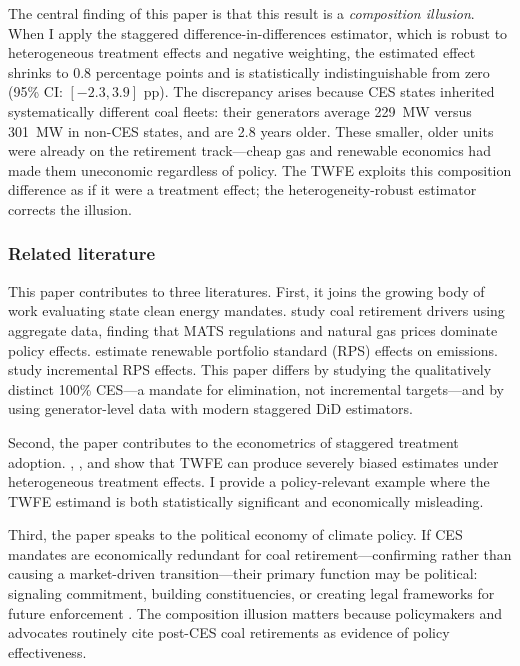 \documentclass[12pt]{article}
\begin{document}
The central finding of this paper is that this result is a \textit{composition illusion}. When I apply the \citet{CallawayS2021} staggered difference-in-differences estimator, which is robust to heterogeneous treatment effects and negative weighting, the estimated effect shrinks to 0.8 percentage points and is statistically indistinguishable from zero (95\% CI: $[-2.3, 3.9]$ pp). The discrepancy arises because CES states inherited systematically different coal fleets: their generators average 229~MW versus 301~MW in non-CES states, and are 2.8 years older. These smaller, older units were already on the retirement track---cheap gas and renewable economics had made them uneconomic regardless of policy. The TWFE exploits this composition difference as if it were a treatment effect; the heterogeneity-robust estimator corrects the illusion.

\subsubsection*{Related literature} This paper contributes to three literatures. First, it joins the growing body of work evaluating state clean energy mandates. \citet{GreenstoneNath2020} study coal retirement drivers using aggregate data, finding that MATS regulations and natural gas prices dominate policy effects. \citet{FellKaffine2018} estimate renewable portfolio standard (RPS) effects on emissions. \citet{UptonSnyder2017} study incremental RPS effects. This paper differs by studying the qualitatively distinct 100\% CES---a mandate for elimination, not incremental targets---and by using generator-level data with modern staggered DiD estimators.

Second, the paper contributes to the econometrics of staggered treatment adoption. \citet{CallawayS2021}, \citet{SunAbraham2021}, and \citet{DeChaisemartinHaultfoeuille2020} show that TWFE can produce severely biased estimates under heterogeneous treatment effects. I provide a policy-relevant example where the TWFE estimand is both statistically significant and economically misleading.

Third, the paper speaks to the political economy of climate policy. If CES mandates are economically redundant for coal retirement---confirming rather than causing a market-driven transition---their primary function may be political: signaling commitment, building constituencies, or creating legal frameworks for future enforcement \citep{Rabe2018, Meckling2017}. The composition illusion matters because policymakers and advocates routinely cite post-CES coal retirements as evidence of policy effectiveness.
\end{document}
